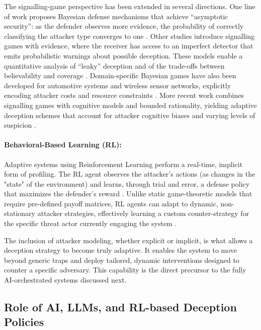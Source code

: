 The signalling-game perspective has been extended in several directions. One
line of work proposes Bayesian defense mechanisms that achieve ``asymptotic
security'': as the defender observes more evidence, the probability of correctly
classifying the attacker type converges to one \cite{asymptoticbayesian2023}.
Other studies introduce signalling games with evidence, where the receiver
has access to an imperfect detector that emits probabilistic warnings about
possible deception. These models enable a quantitative analysis of ``leaky''
deception and of the trade-offs between believability and coverage
\cite{quantdeception2017,leakydeception2018}. Domain-specific Bayesian games
have also been developed for automotive systems and wireless sensor networks,
explicitly encoding attacker costs and resource constraints
\cite{bayesautodeception2024,batterydeception2024}. More recent work combines
signalling games with cognitive models and bounded rationality, yielding adaptive
deception schemes that account for attacker cognitive biases and varying levels
of suspicion \cite{adaptivecognitive2020,gameoftravesty2023}.



\paragraph{Behavioral-Based Learning (RL):} Adaptive systems using Reinforcement Learning perform a real-time,
implicit form of profiling. The RL agent observes the attacker's actions (as changes in the "state" of the environment)
and learns, through trial and error, a defense policy that maximizes the defender's reward \cite{hammad2024deep}.
Unlike static game-theoretic models that require pre-defined payoff matrices, RL agents can adapt to dynamic,
non-stationary attacker strategies, effectively learning a custom counter-strategy for the specific threat actor
currently engaging the system \cite{hammad2024deep}.

The inclusion of attacker modeling, whether explicit or implicit, is what allows a deception strategy to become
truly adaptive. It enables the system to move beyond generic traps and deploy tailored, dynamic interventions
designed to counter a specific adversary. This capability is the direct precursor to the fully AI-orchestrated
systems discussed next.


\subsection{Role of AI, LLMs, and RL-based Deception Policies}

